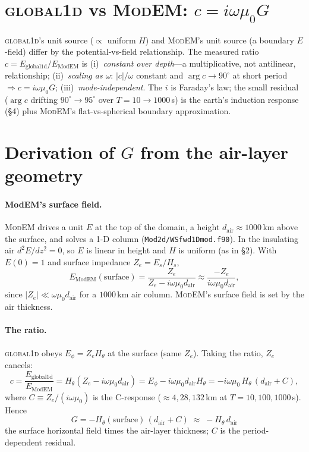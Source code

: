 \documentclass[11pt]{article}
\newcommand{\dair}{d_{\mathrm{air}}}
\newcommand{\Emodem}{E_{\mathrm{ModEM}}}
\newcommand{\Eg}{E_{\mathrm{global1d}}}
\begin{document}
\section{\textsc{global1d} vs \textsc{ModEM}: $c=i\omega\mu_0 G$}
\textsc{global1d}'s unit source ($\propto$ uniform $H$) and \textsc{ModEM}'s unit source (a boundary
$E$-field) differ by the potential-vs-field relationship. The measured ratio $c=\Eg/\Emodem$ is
(i)~\emph{constant over depth}---a multiplicative, not antilinear, relationship;
(ii)~\emph{scaling as $\omega$}: $|c|/\omega$ constant and $\arg c\to90^\circ$ at short period
$\Rightarrow c=i\omega\mu_0 G$; (iii)~\emph{mode-independent}. The $i$ is Faraday's law; the small
residual ($\arg c$ drifting $90^\circ\!\to\!95^\circ$ over $T=10\to1000\,$s) is the earth's induction
response (\S4) plus \textsc{ModEM}'s flat-vs-spherical boundary approximation.

\section{Derivation of $G$ from the air-layer geometry}
\paragraph{ModEM's surface field.} \textsc{ModEM} drives a unit $E$ at the top of the domain, a
height $\dair\approx1000\,$km above the surface, and solves a 1-D column
(\texttt{Mod2d/WSfwd1Dmod.f90}). In the insulating air $d^2E/dz^2=0$, so $E$ is linear in height and
$H$ is uniform (as in \S2). With $E(0)=1$ and surface impedance $Z_e=E_s/H_s$,
\begin{equation}
\Emodem(\text{surface})=\frac{Z_e}{Z_e-i\omega\mu_0\dair}\approx\frac{-Z_e}{i\omega\mu_0\dair},
\end{equation}
since $|Z_e|\ll\omega\mu_0\dair$ for a $1000\,$km air column. \textsc{ModEM}'s surface field is set
by the air thickness.

\paragraph{The ratio.} \textsc{global1d} obeys $E_\phi=Z_e H_\theta$ at the surface (same $Z_e$).
Taking the ratio, $Z_e$ cancels:
\begin{equation}
c=\frac{\Eg}{\Emodem}=H_\theta(Z_e-i\omega\mu_0\dair)=E_\phi-i\omega\mu_0\dair H_\theta
=-i\omega\mu_0\,H_\theta\,(\dair+C),
\end{equation}
where $C\equiv Z_e/(i\omega\mu_0)$ is the C-response ($\approx4,28,132\,$km at $T=10,100,1000\,$s).
Hence
\begin{equation}
\boxed{\ G=-H_\theta(\text{surface})\,(\dair+C)\;\approx\;-H_\theta\,\dair\ }
\end{equation}
the surface horizontal field times the air-layer thickness; $C$ is the period-dependent residual.
\end{document}
